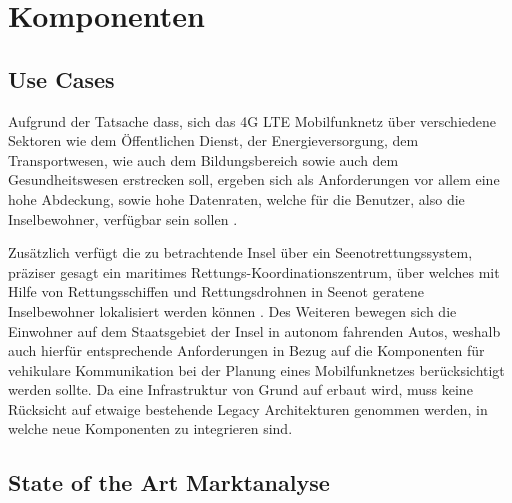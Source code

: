 
%
%
% 
% 
% 


\section{Komponenten}
\label{sec:Komponenten}
	\subsection{Use Cases}
	\label{subsec:Use Cases}
	
	Aufgrund der Tatsache dass, sich das 4G LTE Mobilfunknetz über verschiedene Sektoren wie dem Öffentlichen Dienst, der Energieversorgung, dem Transportwesen, wie auch dem Bildungsbereich sowie auch dem Gesundheitswesen erstrecken soll, ergeben sich als Anforderungen vor allem eine hohe Abdeckung, sowie hohe Datenraten, welche für die Benutzer, also die Inselbewohner, verfügbar sein sollen \cite{Tch18}. 

Zusätzlich verfügt die zu betrachtende Insel über ein Seenotrettungssystem, präziser gesagt ein maritimes Rettungs-Koordinationszentrum, über welches mit Hilfe von Rettungsschiffen und Rettungsdrohnen in Seenot geratene Inselbewohner lokalisiert werden können \cite{eckermann2018tinylte}. Des Weiteren bewegen sich die Einwohner auf dem Staatsgebiet der Insel in autonom fahrenden Autos, weshalb auch hierfür entsprechende Anforderungen in Bezug auf die Komponenten für vehikulare Kommunikation bei der Planung eines Mobilfunknetzes berücksichtigt werden sollte. Da eine Infrastruktur von Grund auf erbaut wird, muss keine Rücksicht auf etwaige bestehende Legacy Architekturen genommen werden, in welche neue Komponenten zu integrieren sind. 
\subsection{State of the Art Marktanalyse}
\label{subsec:Marktanalyse}

